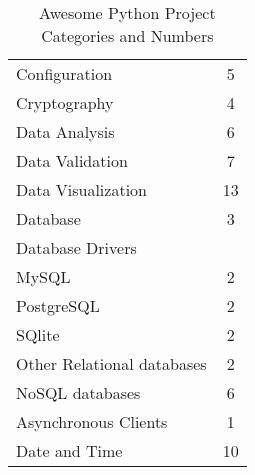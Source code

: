 \begin{table}[ht]
\begin{tabular}{|l|c|}
    Configuration & 5\\
    Cryptography & 4\\
    Data Analysis & 6\\
    Data Validation & 7\\
    Data Visualization & 13\\
    Database & 3\\
    Database Drivers & \\
    MySQL & 2\\
    PostgreSQL  & 2\\
    SQlite & 2\\
    Other Relational databases & 2\\
    NoSQL databases & 6\\
    Asynchronous Clients & 1\\
    Date and Time & 10\\
    \end{tabular}
    \caption{Awesome Python Project Categories and Numbers}
\end{table}

